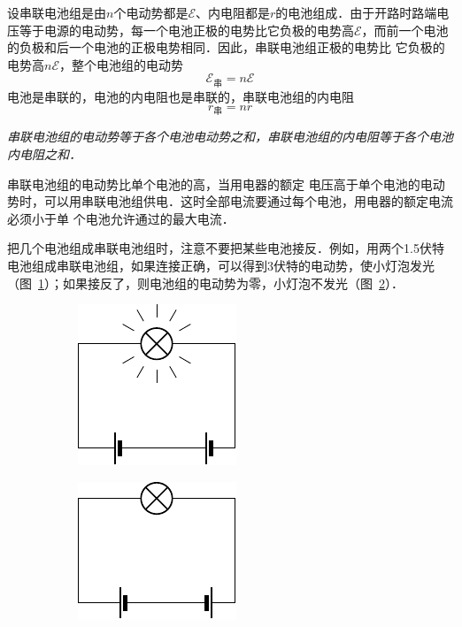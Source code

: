 设串联电池组是由$n$个电动势都是$\mathcal{E}$、内电阻都是$r$的电池组成．由于开路时路端电压等于电源的电动势，每一个电池正极的电势比它负极的电势高$\mathcal{E}$，而前一个电池的负极和后一个电池的正极电势相同．因此，串联电池组正极的电势比
它负极的电势高$n\mathcal{E}$，整个电池组的电动势
\[\mathcal{E}_{\text{串}}=n\mathcal{E}\]
电池是串联的，电池的内电阻也是串联的，串联电池组的内电阻
\[r_{\text{串}}=nr\]

\textit{串联电池组的电动势等于各个电池电动势之和，串联电池组的内电阻等于各个电池内电阻之和．}

串联电池组的电动势比单个电池的高，当用电器的额定
电压高于单个电池的电动势时，可以用串联电池组供电．这时全部电流要通过每个电池，用电器的额定电流必须小于单
个电池允许通过的最大电流．

把几个电池组成串联电池组时，注意不要把某些电池接反．例如，用两个1.5伏特电池组成串联电池组，如果连接正确，可以得到3伏特的电动势，使小灯泡发光（图~\ref{fig_B_7-34a}）；如果接反了，则电池组的电动势为零，小灯泡不发光（图~\ref{fig_B_7-34b}）．
\begin{figure}[htbp]
    \centering
    \begin{subfigure}{0.4\linewidth}
        \centering
        \includegraphics{fig/B/7-34a.pdf}
        \caption{}\label{fig_B_7-34a}
    \end{subfigure}
    \hfil
    \begin{subfigure}{0.4\linewidth}
        \centering
        \includegraphics{fig/B/7-34b.pdf}
        \caption{}\label{fig_B_7-34b}
    \end{subfigure}
    \caption{}\label{fig_B_7-34}
\end{figure}



